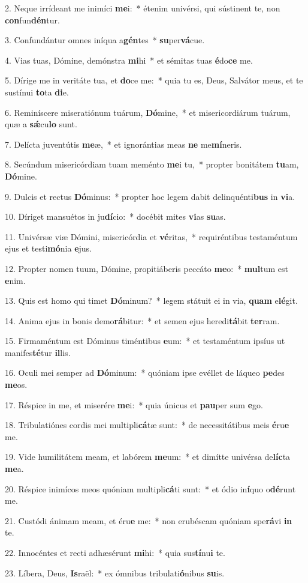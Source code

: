 2. Neque irrídeant me inimíci \textbf{me}i:~*  étenim univérsi, qui sústinent te, non \textbf{con}fun\textbf{dén}tur.\

3. Confundántur omnes iníqua a\textbf{gén}tes~*  \textbf{su}per\textbf{vá}cue.\

4. Vias tuas, Dómine, demónstra \textbf{mi}hi~*  et sémitas tuas \textbf{é}do\textbf{ce} me.\

5. Dírige me in veritáte tua, et \textbf{do}ce me:~*  quia tu es, Deus, Salvátor meus, et te sustínui \textbf{to}ta \textbf{di}e.\

6. Reminíscere miseratiónum tuárum, \textbf{Dó}mine,~*  et misericordiárum tuárum, quæ a \textbf{sǽ}cu\textbf{lo} sunt.\

7. Delícta juventútis \textbf{me}æ,~*  et ignorántias meas \textbf{ne} me\textbf{mí}neris.\

8. Secúndum misericórdiam tuam meménto \textbf{me}i tu,~*  propter bonitátem \textbf{tu}am, \textbf{Dó}mine.\

9. Dulcis et rectus \textbf{Dó}minus:~*  propter hoc legem dabit delinquénti\textbf{bus} in \textbf{vi}a.\

10. Díriget mansuétos in ju\textbf{dí}cio:~*  docébit mites \textbf{vi}as \textbf{su}as.\

11. Univérsæ viæ Dómini, misericórdia et \textbf{vé}ritas,~*  requiréntibus testaméntum ejus et testi\textbf{mó}nia \textbf{e}jus.\

12. Propter nomen tuum, Dómine, propitiáberis peccáto \textbf{me}o:~*  \textbf{mul}tum est \textbf{e}nim.\

13. Quis est homo qui timet \textbf{Dó}minum?~*  legem státuit ei in via, \textbf{quam} e\textbf{lé}git.\

14. Anima ejus in bonis demo\textbf{rá}bitur:~*  et semen ejus heredi\textbf{tá}bit \textbf{ter}ram.\

15. Firmaméntum est Dóminus timéntibus \textbf{e}um:~*  et testaméntum ipsíus ut manifes\textbf{té}tur \textbf{il}lis.\

16. Oculi mei semper ad \textbf{Dó}minum:~*  quóniam ipse evéllet de láqueo \textbf{pe}des \textbf{me}os.\

17. Réspice in me, et miserére \textbf{me}i:~*  quia únicus et \textbf{pau}per sum \textbf{e}go.\

18. Tribulatiónes cordis mei multipli\textbf{cá}tæ sunt:~*  de necessitátibus meis \textbf{é}ru\textbf{e} me.\

19. Vide humilitátem meam, et labórem \textbf{me}um:~*  et dimítte univérsa de\textbf{líc}ta \textbf{me}a.\

20. Réspice inimícos meos quóniam multipli\textbf{cá}ti sunt:~*  et ódio in\textbf{í}quo o\textbf{dé}runt me.\

21. Custódi ánimam meam, et éru\textbf{e} me:~*  non erubéscam quóniam spe\textbf{rá}vi \textbf{in} te.\

22. Innocéntes et recti adhæsérunt \textbf{mi}hi:~*  quia sus\textbf{tí}nu\textbf{i} te.\

23. Líbera, Deus, \textbf{Is}raël:~*  ex ómnibus tribulati\textbf{ó}nibus \textbf{su}is.\

